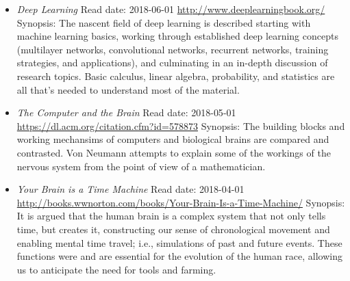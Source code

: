 \documentclass{article}%
\begin{document}
\begin{itemize}
\item%
\textit{Deep Learning}%
\newline%
Read date: 2018{-}06{-}01%
\newline%
\href{http://www.deeplearningbook.org/}{http://www.deeplearningbook.org/}%
\newline%
Synopsis: The nascent field of deep learning is described starting with machine learning basics, working through established deep learning concepts (multilayer networks, convolutional networks, recurrent networks, training strategies, and applications), and culminating in an in{-}depth discussion of research topics. Basic calculus, linear algebra, probability, and statistics are all that's needed to understand most of the material.%
\item%
\textit{The Computer and the Brain}%
\newline%
Read date: 2018{-}05{-}01%
\newline%
\href{https://dl.acm.org/citation.cfm?id=578873}{https://dl.acm.org/citation.cfm?id=578873}%
\newline%
Synopsis: The building blocks and working mechansims of computers and biological brains are compared and contrasted. Von Neumann attempts to explain some of the workings of the nervous system from the point of view of a mathematician.%
\item%
\textit{Your Brain is a Time Machine}%
\newline%
Read date: 2018{-}04{-}01%
\newline%
\href{http://books.wwnorton.com/books/Your{-}Brain{-}Is{-}a{-}Time{-}Machine/}{http://books.wwnorton.com/books/Your{-}Brain{-}Is{-}a{-}Time{-}Machine/}%
\newline%
Synopsis: It is argued that the human brain is a complex system that not only tells time, but creates it, constructing our sense of chronological movement and enabling mental time travel; i.e., simulations of past and future events. These functions were and are essential for the evolution of the human race, allowing us to anticipate the need for tools and farming.%
\end{itemize}

%
\end{document}

